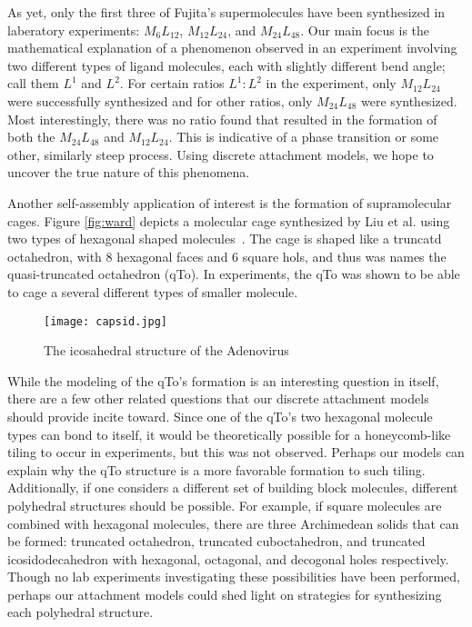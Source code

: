 \documentclass[12pt]{article}
\begin{document}
As yet, only the first three of Fujita's supermolecules have been synthesized in laberatory experiments: $M_{6}L_{12}$, $M_{12}L_{24}$, and $M_{24}L_{48}$. Our main focus is the mathematical explanation of a phenomenon observed in an experiment involving two different types of ligand molecules, each with slightly different bend angle; call them $L^1$ and $L^2$. For certain ratios $L^1:L^2$ in the experiment, only $M_{12}L_{24}$ were successfully synthesized and for other ratios, only $M_{24}L_{48}$ were synthesized. Most interestingly, there was no ratio found that resulted in the formation of both the $M_{24}L_{48}$ and $M_{12}L_{24}$. This is indicative of a phase transition or some other, similarly steep process. Using discrete attachment models, we hope to uncover the true nature of this phenomena. 

Another self-assembly application of interest is the formation of supramolecular cages. Figure \ref{fig:ward} depicts a molecular cage synthesized by Liu et al. using two types of hexagonal shaped molecules~\cite{Liu2011}. The cage is shaped like a truncatd octahedron, with 8 hexagonal faces and 6 square hols, and thus was names the quasi-truncated octahedron (qTo). In experiments, the qTo was shown to be able to cage a several different types of smaller molecule. 


\begin{figure}[!b]
\centering
\texttt{[image: capsid.jpg]}
\caption{The icosahedral structure of the Adenovirus}
\label{fig:capsid}
\end{figure}

While the modeling of the qTo's formation is an interesting question in itself, there are a few other related questions that our discrete attachment models should provide incite toward. Since one of the qTo's two hexagonal molecule types can bond to itself, it would be theoretically possible for a honeycomb-like tiling to occur in experiments, but this was not observed. Perhaps our models can explain why the qTo structure is a more favorable formation to such tiling. Additionally, if one considers a different set of building block molecules, different polyhedral structures should be possible. For example, if square molecules are combined with hexagonal molecules, there are three Archimedean solids that can be formed: truncated octahedron, truncated cuboctahedron, and truncated icosidodecahedron with hexagonal, octagonal, and decogonal holes respectively. Though no lab experiments investigating these possibilities have been performed, perhaps our attachment models could shed light on strategies for synthesizing each polyhedral structure. 
\end{document}
